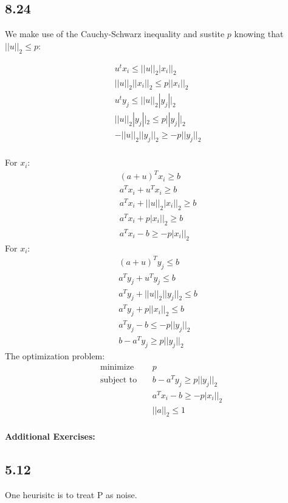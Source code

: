 \documentclass[12pt]{article}
\newenvironment{proposition}[2][Proposition]{\begin{trivlist}
\item[\hskip \labelsep {\bfseries #1}\hskip \labelsep {\bfseries #2.}]}{\end{trivlist}}
\begin{document}
\subsection*{8.24}
We make use of the Cauchy-Schwarz inequality and sustite $p$ knowing that $||u||_2 \le p$:
\begin{proposition}{1}
\begin{align}
u^tx_i \le ||u||_2|x_i||_2\\
||u||_2||x_i||_2 \le p||x_i||_2\\
u^ty_j \le ||u||_2|y_j||_2\\
||u||_2|y_j||_2 \le p||y_j||_2\\
-||u||_2||y_j||_2 \ge -p||y_j||_2\\
\end{align}
\end{proposition}
For $x_i$:
\begin{equation*}
\begin{aligned}
(a+u)^Tx_i \ge b\\
a^Tx_i+u^Tx_i \ge b\\
a^Tx_i+||u||_2|x_i||_2 \ge b\\
a^Tx_i+p|x_i||_2 \ge b\\
a^Tx_i-b \ge -p|x_i||_2
\end{aligned}
\end{equation*}
For $x_i$:
\begin{equation*}
\begin{aligned}
(a+u)^Ty_j \le b\\
a^Ty_j+u^Ty_j \le b\\
a^Ty_j+||u||_2||y_j||_2 \le b\\
a^Ty_j+p||x_i||_2 \le b\\
a^Ty_j-b \le -p||y_j||_2\\
b-a^Ty_j \ge p||y_j||_2
\end{aligned}
\end{equation*}
The optimization problem:
\begin{equation*}
\begin{aligned}
& \underset{}{\text{minimize}}
& & p\\
& \text{subject to}\
& & b-a^Ty_j \ge p||y_j||_2\\
&&& a^Tx_i-b \ge -p|x_i||_2\\
&&& ||a||_2 \le 1
\end{aligned}
\end{equation*}\\
\textbf{Additional Exercises:}\\
\subsection*{5.12}
One heurisitc is to treat P as noise.
\end{document}
